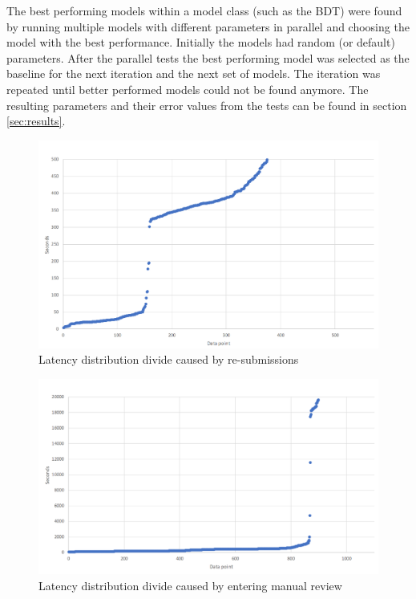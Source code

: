 The best performing models within a model class (such as the BDT) were found by running multiple models with different parameters in parallel and choosing the model with the best performance.
Initially the models had random (or default) parameters.
After the parallel tests the best performing model was selected as the baseline for the next iteration and the next set of models.
The iteration was repeated until better performed models could not be found anymore.
The resulting parameters and their error values from the tests can be found in section \ref{sec:results}.

\begin{figure}[htbp]
    \centering \includegraphics[width=0.9\linewidth]{gfx/graphs/resubmissions.png}
    \caption{Latency distribution divide caused by re-submissions}
    \label{fig:resubmissions}
\end{figure}

\begin{figure}[htbp]
    \centering \includegraphics[width=0.9\linewidth]{gfx/graphs/manualreview.png}
    \caption{Latency distribution divide caused by entering manual review}
    \label{fig:manualreview}
\end{figure}

